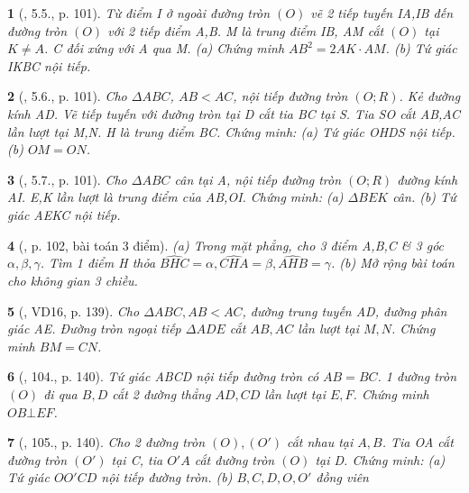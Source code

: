 \documentclass{article}
\newtheorem{baitoan}{}
\begin{document}
\begin{baitoan}[\cite{Binh_boi_duong_Toan_9_tap_2}, 5.5., p. 101]
	Từ điểm I ở ngoài đường tròn $(O)$ vẽ 2 tiếp tuyến IA,IB đến đường tròn $(O)$ với 2 tiếp điểm A,B. M là trung điểm IB, AM cắt $(O)$ tại $K\ne A$. C đối xứng với A qua M. (a) Chứng minh $AB^2 = 2AK\cdot AM$. (b) Tứ giác IKBC nội tiếp.
\end{baitoan}

\begin{baitoan}[\cite{Binh_boi_duong_Toan_9_tap_2}, 5.6., p. 101]
	Cho $\Delta ABC$, $AB < AC$, nội tiếp đường tròn $(O;R)$. Kẻ đường kính AD. Vẽ tiếp tuyến với đường tròn tại D cắt tia BC tại S. Tia SO cắt AB,AC lần lượt tại M,N. H là trung điểm BC. Chứng minh: (a) Tứ giác OHDS nội tiếp. (b) $OM = ON$.
\end{baitoan}

\begin{baitoan}[\cite{Binh_boi_duong_Toan_9_tap_2}, 5.7., p. 101]
	Cho $\Delta ABC$ cân tại A, nội tiếp đường tròn $(O;R)$ đường kính AI. E,K lần lượt là trung điểm của AB,OI. Chứng minh: (a) $\Delta BEK$ cân. (b) Tứ giác AEKC nội tiếp.
\end{baitoan}

\begin{baitoan}[\cite{Binh_boi_duong_Toan_9_tap_2}, p. 102, bài toán 3 điểm]
	(a) Trong mặt phẳng, cho 3 điểm A,B,C \& 3 góc $\alpha,\beta,\gamma$. Tìm 1 điểm H thỏa $\widehat{BHC} = \alpha,\widehat{CHA} = \beta,\widehat{AHB} = \gamma$. (b) Mở rộng bài toán cho không gian 3 chiều.
\end{baitoan}

\begin{baitoan}[\cite{Tuyen_Toan_9_old}, VD16, p. 139]
	Cho $\Delta ABC,AB < AC$, đường trung tuyến AD, đường phân giác AE. Đường tròn ngoại tiếp $\Delta ADE$ cắt $AB,AC$ lần lượt tại $M,N$. Chứng minh $BM = CN$.
\end{baitoan}

\begin{baitoan}[\cite{Tuyen_Toan_9_old}, 104., p. 140]
	Tứ giác ABCD nội tiếp đường tròn có $AB = BC$. 1 đường tròn $(O)$ đi qua $B,D$ cắt 2 đường thẳng $AD,CD$ lần lượt tại $E,F$. Chứng minh $OB\bot EF$.
\end{baitoan}

\begin{baitoan}[\cite{Tuyen_Toan_9_old}, 105., p. 140]
	Cho 2 đường tròn $(O),(O')$ cắt nhau tại $A,B$. Tia OA cắt đường tròn $(O')$ tại C, tia $O'A$ cắt đường tròn $(O)$ tại D. Chứng minh: (a) Tứ giác $OO'CD$ nội tiếp đường tròn. (b) $B,C,D,O,O'$ đồng viên
\end{baitoan}
\end{document}
